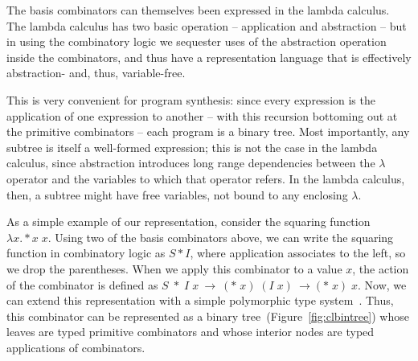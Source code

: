 \documentclass{article}
\begin{document}
The basis combinators can
themselves been expressed in the lambda calculus. The lambda calculus
has two basic operation -- application and abstraction -- but in using
the combinatory logic we sequester uses of the abstraction operation
inside the combinators, and thus have a representation language that
is effectively abstraction- and, thus, variable-free. 

This is very convenient for program synthesis: since every expression
is the application of one expression to another -- with this recursion
bottoming out at the primitive combinators -- each program is a binary
tree. Most importantly, any subtree is itself a well-formed
expression; this is not the case in the lambda calculus, since
abstraction introduces long range dependencies between the $\lambda$
operator and the variables to which that operator refers. In the
lambda calculus, then, a subtree might have free variables, not bound
to any enclosing $\lambda$. 

As a simple example of our representation, consider the squaring
function $\lambda x. * x\; x $. Using two of the basis combinators above,
we can write the squaring function in combinatory logic as $S * I$,
where application associates to the left, so we drop the
parentheses. When we apply this combinator to a value $x$, the action
of the combinator is defined as $S \;*\; I\; x~\rightarrow~(*\; x)\;
(I\; x)~\rightarrow(*\; x)\; x$. Now, we can extend this
representation with a simple polymorphic type
system~\cite{Pierce_2002}. Thus, this combinator can be represented as
a binary tree~(Figure~\ref{fig:clbintree}) whose leaves are typed
primitive combinators and whose interior nodes are typed applications
of combinators.
\end{document}
